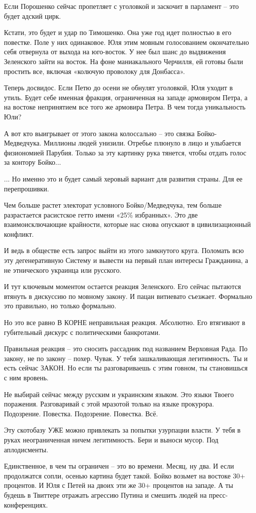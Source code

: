 Если Порошенко сейчас пропетляет с уголовкой и заскочит в парламент – это будет
адский цирк.

Кстати, это будет и удар по Тимошенко. Она уже год идет полностью в его
повестке. Поле у них одинаковое. Юля этим мовным голосованием окончательно себя
отвернула от выхода на юго-восток. У нее был шанс до выдвижения Зеленского
зайти на восток. На фоне маниакального Черчилля, ей готовы были простить все,
включая «колючую проволоку для Донбасса».

Теперь досвидос. Если Петю до осени не обнулят уголовкой, Юля уходит в утиль.
Будет себе именная фракция, ограниченная на западе армовиром Петра, а на
востоке непринятием все того же армовира Петра. В чем тогда уникальность Юли?

А вот кто выигрывает от этого закона колоссально – это связка Бойко-Медведчука.
Миллионы людей унизили. Отребье плюнуло в лицо и улыбается физиономией Парубия.
Только за эту картинку рука тянется, чтобы отдать голос за контору Бойко...

... Но именно это и будет самый херовый вариант для развития страны. Для ее
перепрошивки.

Чем больше растет электорат условного Бойко/Медведчука, тем больше разрастается
расистское гетто имени «25\% избранных». Это две взаимоисключающие крайности,
которые нас снова опускают в цивилизационный конфликт.

И ведь в обществе есть запрос выйти из этого замкнутого круга. Поломать всю эту
дегенеративную Систему и вывести на первый план интересы Гражданина, а не
этнического украинца или русского.

И тут ключевым моментом остается реакция Зеленского. Его сейчас пытаются
втянуть в дискуссию по мовному закону. И пацан витиевато съезжает. Формально
это правильно, но только формально.

Но это все равно В КОРНЕ неправильная реакция. Абсолютно. Его втягивают в
губительный дискурс с политическими банкротами.

Правильная реакция – это сносить рассадник под названием Верховная Рада. По
закону, не по закону – похер. Чувак. У тебя зашкаливающая легитимность. Ты и
есть сейчас ЗАКОН. Но если ты разговариваешь с этим говном, ты становишься с
ним вровень.

Не выбирай сейчас между русским и украинским языком. Это языки Твоего
поражения. Разговаривай с этой мразотой только на языке прокурора. Подозрение.
Повестка. Подозрение. Повестка. Всё.

Эту скотобазу УЖЕ можно привлекать за попытки узурпации власти. У тебя в руках
неограниченная ничем легитимность. Бери и выноси мусор. Под аплодисменты.

Единственное, в чем ты ограничен – это во времени. Месяц, ну два. И если
продолжатся сопли, осенью картина будет такой. Бойко возьмет на востоке 30+
процентов. И Юля с Петей на двоих эти же 30+ процентов на западе. А ты будешь в
Твиттере отражать агрессию Путина и смешить людей на пресс-конференциях.

